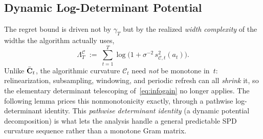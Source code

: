 \documentclass[twoside]{article}
\newcommand{\Calg}{\mathcal{C}}                 %
\newcommand{\Lamalg}{\Lambda^{\Calg}}           %
\begin{document}
\FloatBarrier %


\subsection{Dynamic Log-Determinant Potential}\label{sec:dynamic-potential}

The regret bound is driven not by $\gamma_T$ but by the realized
\emph{width complexity} of the widths the algorithm actually uses,
\begin{equation}\label{eq:lam-alg}
  \Lamalg_T \;:=\; \sum_{t=1}^T
  \log\!\bigl(1+\sigma^{-2}\,s_{\Calg,t}^2(a_t)\bigr).
\end{equation}
Unlike $\bar{\mathbf{C}}_t$, the algorithmic curvature $\Calg_t$ need \emph{not} be
monotone in~$t$: relinearization, subsampling, windowing, and periodic
refresh can all \emph{shrink} it, so the elementary determinant
telescoping of~\eqref{eq:infogain} no longer applies.  The following lemma
prices this nonmonotonicity exactly, through a pathwise log-determinant
identity.  This \emph{pathwise determinant identity} (a dynamic potential
decomposition) is what lets the analysis handle a general predictable SPD
curvature sequence rather than a monotone Gram matrix.
\end{document}
